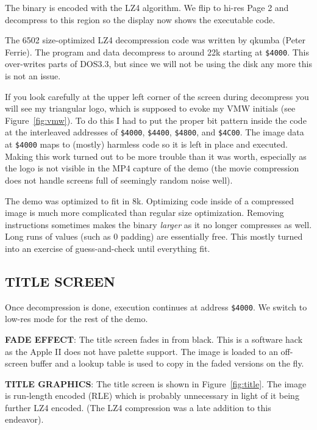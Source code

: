 \documentclass[twocolumn]{article}
\begin{document}
The binary is encoded with the LZ4 algorithm.
We flip to hi-res Page 2 and decompress to this region so the display
now shows the executable code.

The 6502 size-optimized LZ4 decompression code was written by qkumba
(Peter Ferrie).
The program and data decompress to around 22k starting at {\tt \$4000}.
This over-writes parts of DOS3.3, but since we will not be using the disk 
any more this is not an issue.

If you look carefully at the upper left corner of the screen during
decompress you will see my triangular logo, which is supposed to evoke
my VMW initials (see Figure~\ref{fig:vmw}).
To do this I had to put the proper bit pattern inside the code
at the interleaved addresses of {\tt \$4000}, {\tt \$4400}, {\tt \$4800},
and {\tt \$4C00}.
The image data at {\tt \$4000} maps to (mostly)
harmless code so it is left in place and executed.
Making this work turned out to be more trouble than it was worth, especially
as the logo is not visible in the MP4 capture of the demo (the movie
compression does not handle screens full of seemingly random noise well).

The demo was optimized to fit in 8k.
Optimizing code inside of a compressed image is much more complicated than
regular size optimization.
Removing instructions sometimes makes the binary {\em larger} as it no longer
compresses as well.
Long runs of values (such as 0 padding) are essentially free.
This mostly turned into an exercise of guess-and-check until everything fit.


\subsection{TITLE SCREEN}

Once decompression is done, execution continues at address {\tt \$4000}.
We switch to low-res mode for the rest of the demo.

\noindent
{\bf FADE EFFECT}:
The title screen fades in from black.
This is a software hack as the Apple II does not have palette support.
The image is loaded to an off-screen buffer and a lookup table is used to
copy in the faded versions on the fly.

\noindent
{\bf TITLE GRAPHICS}:
The title screen is shown in Figure~\ref{fig:title}.
The image is run-length encoded (RLE) which is
probably unnecessary in light of it being further LZ4 encoded.
(The LZ4 compression was a late addition to this endeavor).
\end{document}
